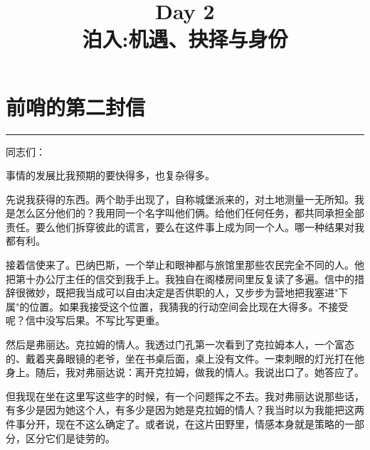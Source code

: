 \documentclass[12pt,a4paper]{article}
\title{\bfseries Day 2\\[0.3em]泊入:机遇、抉择与身份}
\author{}
\date{}
\begin{document}
\maketitle

\vspace{-2em}

\vspace{1em}

\section{前哨的第二封信}
\vspace{0.5em}
\vspace{0.3em}

\noindent\rule{\textwidth}{0.4pt}

\vspace{0.3em}



同志们：



事情的发展比我预期的要快得多，也复杂得多。



先说我获得的东西。两个助手出现了，自称城堡派来的，对土地测量一无所知。我是怎么区分他们的？我用同一个名字叫他们俩。给他们任何任务，都共同承担全部责任。要么他们拆穿彼此的谎言，要么在这件事上成为同一个人。哪一种结果对我都有利。



接着信使来了。巴纳巴斯，一个举止和眼神都与旅馆里那些农民完全不同的人。他把第十办公厅主任的信交到我手上。我独自在阁楼房间里反复读了多遍。信中的措辞很微妙，既把我当成可以自由决定是否供职的人，又步步为营地把我塞进"下属"的位置。如果我接受这个位置，我猜我的行动空间会比现在大得多。不接受呢？信中没写后果。不写比写更重。



然后是弗丽达。克拉姆的情人。我透过门孔第一次看到了克拉姆本人，一个富态的、戴着夹鼻眼镜的老爷，坐在书桌后面，桌上没有文件。一束刺眼的灯光打在他身上。随后，我对弗丽达说：离开克拉姆，做我的情人。我说出口了。她答应了。



但我现在坐在这里写这些字的时候，有一个问题挥之不去。我对弗丽达说那些话，有多少是因为她这个人，有多少是因为她是克拉姆的情人？我当时以为我能把这两件事分开，现在不这么确定了。或者说，在这片田野里，情感本身就是策略的一部分，区分它们是徒劳的。
\end{document}
